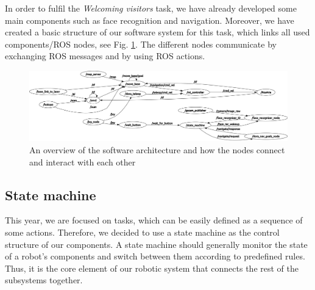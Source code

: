 \documentclass[conference]{IEEEtran}
\begin{document}
In order to fulfil the \textit{Welcoming visitors} task, we have already developed some main components such as face recognition and navigation. Moreover, we have created a basic structure of our software system for this task, which links all used components/ROS nodes, see Fig. \ref{fig:nodes}. The different nodes communicate by exchanging ROS messages and by using ROS actions.

\begin{figure}[!t]
\centering
\includegraphics[width=\textwidth]{nodes_cut.png}
\caption{An overview of the software architecture and how the nodes connect and interact with each other}
\label{fig:nodes}
\end{figure}

\subsection{State machine}
This year, we are focused on tasks, which can be easily defined as a sequence of some actions. Therefore, we decided to use a state machine as the control structure of our components. A state machine should generally monitor the state of a robot's components and switch between them according to predefined rules. Thus, it is the core element of our robotic system that connects the rest of the subsystems together.
\end{document}
